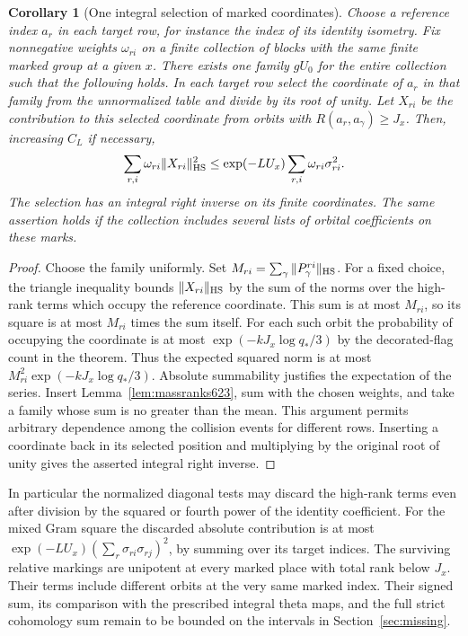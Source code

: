\documentclass[a4paper,11pt]{article}
\newtheorem{corollary}[proposition]{Corollary}
\theoremstyle{definition}
\theoremstyle{remark}
\numberwithin{equation}{section}
\begin{document}
\begin{corollary}[One integral selection of marked coordinates]
\leavevmode\label{cor:integralranks623}
Choose a reference index \(a_r\) in each target row, for instance
the index of its identity isometry. Fix nonnegative weights
\(\omega_{ri}\) on a finite collection of blocks with the same
finite marked group at a given \(x\). There exists one family
\(gU_0\) for the entire collection such that the following holds.
In each target row select the coordinate of \(a_r\) in that
family from the unnormalized table and divide by its root of
unity. Let \(X_{ri}\) be the contribution to this selected
coordinate from orbits with \(R(a_r,a_\gamma)\ge J_x\).
Then, increasing \(C_L\) if necessary,
\[
       \sum_{r,i}\omega_{ri}\|X_{ri}\|_{\rm HS}^2
          \le \exp(-LU_x)\sum_{r,i}\omega_{ri}\sigma_{ri}^2.
\]
The selection has an integral right inverse on its finite
coordinates. The same assertion holds if the collection includes
several lists of orbital coefficients on these marks.
\end{corollary}
\begin{proof}
Choose the family uniformly. Set \(M_{ri}=\sum_\gamma
\|P_\gamma^{ri}\|_{\rm HS}\). For a fixed choice, the triangle
inequality bounds \(\|X_{ri}\|_{\rm HS}\) by the sum of the
norms over the high-rank terms which occupy the reference
coordinate. This sum is at most \(M_{ri}\), so its square is at
most \(M_{ri}\) times the sum itself. For each such orbit the
probability of occupying the coordinate is at most
\(\exp(-kJ_x\log q_*/3)\) by the decorated-flag count in the
theorem. Thus the expected squared norm is at most
\(M_{ri}^2\exp(-kJ_x\log q_*/3)\). Absolute summability justifies
the expectation of the series. Insert Lemma~\ref{lem:massranks623},
sum with the chosen weights, and take a family whose sum is no
greater than the mean. This argument permits arbitrary dependence
among the collision events for different rows. Inserting a
coordinate back in its selected position and multiplying by the
original root of unity gives the asserted integral right inverse.
\end{proof}

In particular the normalized diagonal tests may discard the
high-rank terms even after division by the squared or fourth
power of the identity coefficient. For the mixed Gram square
the discarded absolute contribution is at most
\(\exp(-LU_x)(\sum_r\sigma_{ri}\sigma_{rj})^2\), by summing over
its target indices. The surviving relative markings are
unipotent at every marked place with total rank below \(J_x\).
Their terms include different orbits at the very same marked
index. Their signed sum, its comparison with the prescribed
integral theta maps, and the full strict cohomology sum remain
to be bounded on the intervals in Section~\ref{sec:missing}.
\end{document}
